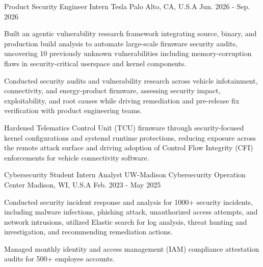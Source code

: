 

\begin{cventries}

  \cventry
    {Product Security Engineer Intern} %
    {Tesla} %
    {Palo Alto, CA, U.S.A} %
    {Jun. 2026 - Sep. 2026} %
    {
      \begin{cvitems} %
        \item {Built an agentic vulnerability research framework integrating source, binary, and production build analysis to automate large-scale firmware security audits, uncovering 10 previously unknown vulnerabilities including memory-corruption flaws in security-critical userspace and kernel components.}
        \item {Conducted security audits and vulnerability research across vehicle infotainment, connectivity, and energy-product firmware, assessing security impact, exploitability, and root causes while driving remediation and pre-release fix verification with product engineering teams.}
        \item {Hardened Telematics Control Unit (TCU) firmware through security-focused kernel configurations and systemd runtime protections, reducing exposure across the remote attack surface and driving adoption of Control Flow Integrity (CFI) enforcements for vehicle connectivity software.}
      \end{cvitems}
    }

  \cventry
    {Cybersecurity Student Intern Analyst} %
    {UW-Madison Cybersecurity Operation Center} %
    {Madison, WI, U.S.A} %
    {Feb. 2023 - May 2025} %
    {
      \begin{cvitems} %
        \item {Conducted security incident response and analysis for 1000+ security incidents, including malware infections, phishing attack, unauthorized access attempts, and network intrusions, utilized Elastic search for log analysis, threat hunting and investigation, and recommending remediation actions.}
        \item {Managed monthly identity and access management (IAM) compliance attestation audits for 500+ employee accounts.}
      \end{cvitems}
    }


\end{cventries}
